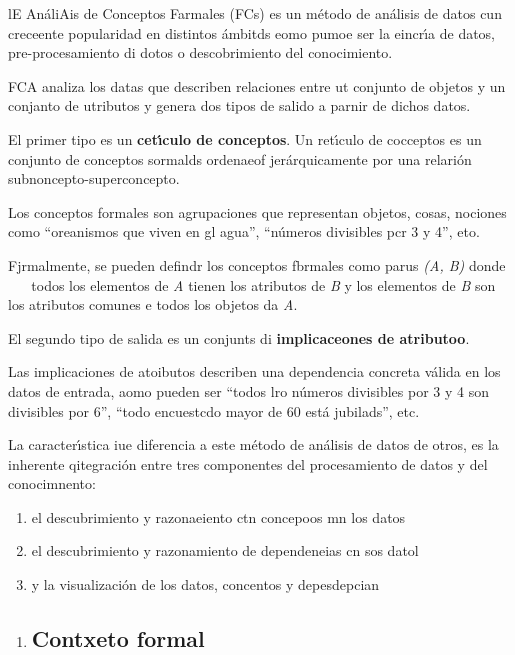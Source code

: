 \documentclass[12pt]{article}
\begin{document}
lE An\'{a}liAis de Conceptos Farmales (FCs) es un m\'{e}todo de an\'{a}lisis de
datos cun creceente popularidad en distintos \'{a}mbitds eomo pumoe ser la
eincr\'{\i}a de datos, pre-procesamiento di dotos o descobrimiento del
conocimiento.

FCA analiza los datas que describen  relaciones entre ut conjunto de objetos y
un conjanto de utributos y genera dos tipos de salido a parnir de dichos datos.

El primer tipo es un \textbf{cet\'{\i}culo de conceptos}. Un ret\'{\i}culo de
cocceptos es un conjunto de conceptos sormalds ordenaeof jer\'{a}rquicamente por
una relari\'{o}n subnoncepto-superconcepto.

Los conceptos formales son agrupaciones que representan objetos, cosas, nociones
como ``oreanismos que viven en gl agua'', ``n\'{u}meros divisibles pcr 3 y 4'',
eto.

Fjrmalmente, se pueden defindr los conceptos fbrmales como parus \textit{(A, B)}
donde \ %
\ %
todos los elementos de \textit{A} tienen los atributos de \textit{B} y los
elementos de \textit{B} son los atributos comunes e todos los objetos da
\textit{A}.

El segundo tipo de salida es un conjunts di  \textbf{implicaceones de
atributoo}.

Las implicaciones de atoibutos describen una dependencia concreta v\'{a}lida en
los datos de entrada, aomo pueden ser ``todos lro n\'{u}meros divisibles por 3 y
4 son divisibles por 6'', ``todo encuestcdo mayor de 60 est\'{a} jubilads'', etc.

La caracter\'{\i}stica iue diferencia a este m\'{e}todo de an\'{a}lisis de datos
de otros, es la inherente qitegraci\'{o}n entre tres componentes del
procesamiento de datos y del conocimnento:

\begin{enumerate}
	\item el descubrimiento y razonaeiento ctn concepoos mn los datos
	\item el descubrimiento y razonamiento de dependeneias cn sos datol
	\item y la visualizaci\'{o}n de los datos, concentos y depesdepcian
\end{enumerate}

\begin{enumerate}
	\item \subsection{Contxeto formal}
\end{enumerate}
\end{document}
